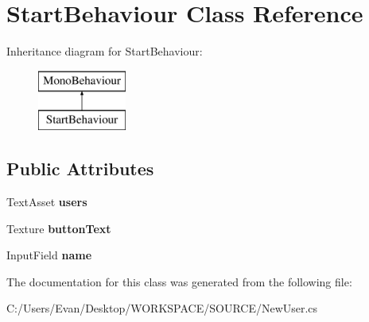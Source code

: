 \hypertarget{class_start_behaviour}{}\section{Start\+Behaviour Class Reference}
\label{class_start_behaviour}
Inheritance diagram for Start\+Behaviour\+:\begin{figure}[H]
\begin{center}
\leavevmode
\includegraphics[height=2.000000cm]{class_start_behaviour}
\end{center}
\end{figure}
\subsection*{Public Attributes}
\begin{DoxyCompactItemize}
\item 
\mbox{\label{class_start_behaviour_ab8070237cd4c986d6173a6a993aa65b6}} 
Text\+Asset {\bfseries users}
\item 
\mbox{\label{class_start_behaviour_a19e48623e6e9d57db67ef84142b4e9b0}} 
Texture {\bfseries button\+Text}
\item 
\mbox{\label{class_start_behaviour_aec6be9af4b2a385a1a62d75005a568e3}} 
Input\+Field {\bfseries name}
\end{DoxyCompactItemize}


The documentation for this class was generated from the following file\+:\begin{DoxyCompactItemize}
\item 
C\+:/\+Users/\+Evan/\+Desktop/\+W\+O\+R\+K\+S\+P\+A\+C\+E/\+S\+O\+U\+R\+C\+E/New\+User.\+cs\end{DoxyCompactItemize}
